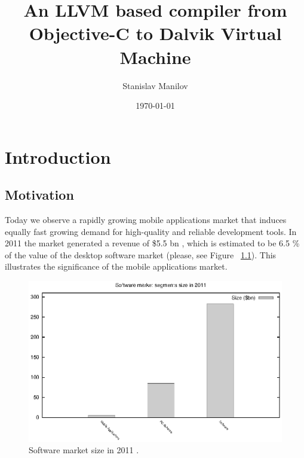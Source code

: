 \documentclass[parskip]{cs4rep}
\begin{document}
\title{An LLVM based compiler from Objective-C to Dalvik Virtual Machine}

\author{Stanislav Manilov}



\date{\today}


\maketitle

\tableofcontents


\chapter{Introduction}

\section{Motivation}

Today we observe a rapidly growing mobile applications market \cite{P1}
that induces equally fast growing demand for high-quality and reliable development
tools. In 2011 the market generated a revenue of \$5.5 bn \cite{P1},
which is estimated to be 6.5 \% of the value of the desktop software market
(please, see Figure ~\ref{fig:softwareMarket2011}). This illustrates the significance of the mobile applications market.

\begin{figure}[h!]
  \label{fig:softwareMarket2011}
  \caption{Software market size in 2011 \cite{P1} \cite{P2} \cite{P3}.}
  \centering
    \includegraphics[width=1.0\textwidth]{markets}
\end{figure}
\end{document}
